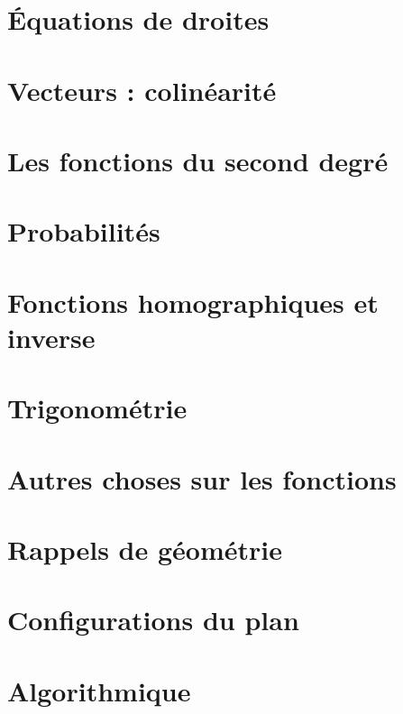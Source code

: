 \documentclass[a4paper,12pt]{book}
\begin{document}
\chapter{Équations de droites}


\chapter{Vecteurs : colinéarité}


\chapter{Les fonctions du second degré}


\chapter{Probabilités}


\chapter{Fonctions homographiques et inverse}


\chapter{Trigonométrie}



\chapter{Autres choses sur les fonctions}


\chapter{Rappels de géométrie}


\chapter{Configurations du plan}


\chapter{Algorithmique}

\end{document}
